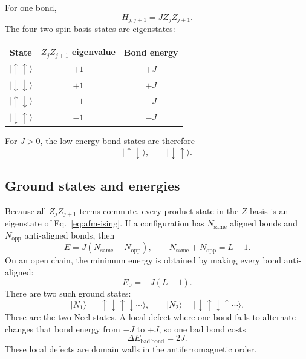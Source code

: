 \documentclass[11pt]{article}
\newcommand{\ket}[1]{|#1\rangle}
\newcommand{\up}{\uparrow}
\newcommand{\down}{\downarrow}
\begin{document}
For one bond,
\begin{equation}
  H_{j,j+1}=JZ_jZ_{j+1}.
\end{equation}
The four two-spin basis states are eigenstates:
\begin{center}
\begin{tabular}{ccc}
\toprule
State & $Z_jZ_{j+1}$ eigenvalue & Bond energy \\
\midrule
$\ket{\up\up}$ & $+1$ & $+J$ \\
$\ket{\down\down}$ & $+1$ & $+J$ \\
$\ket{\up\down}$ & $-1$ & $-J$ \\
$\ket{\down\up}$ & $-1$ & $-J$ \\
\bottomrule
\end{tabular}
\end{center}
For $J>0$, the low-energy bond states are therefore
\begin{equation}
  \ket{\up\down},
  \qquad
  \ket{\down\up}.
\end{equation}

\subsection{Ground states and energies}

Because all $Z_jZ_{j+1}$ terms commute, every product state in the $Z$ basis is
an eigenstate of Eq.~\eqref{eq:afm-ising}. If a configuration has
$N_{\mathrm{same}}$ aligned bonds and $N_{\mathrm{opp}}$ anti-aligned bonds,
then
\begin{equation}
  E=J(N_{\mathrm{same}}-N_{\mathrm{opp}}),
  \qquad
  N_{\mathrm{same}}+N_{\mathrm{opp}}=L-1.
\end{equation}
On an open chain, the minimum energy is obtained by making every bond
anti-aligned:
\begin{equation}
  E_0=-J(L-1).
\end{equation}
There are two such ground states:
\begin{equation}
  \ket{N_1}=\ket{\up\down\up\down\cdots},
  \qquad
  \ket{N_2}=\ket{\down\up\down\up\cdots}.
  \label{eq:neel-states}
\end{equation}
These are the two Neel states. A local defect where one bond fails to alternate
changes that bond energy from $-J$ to $+J$, so one bad bond costs
\begin{equation}
  \Delta E_{\mathrm{bad\ bond}}=2J.
\end{equation}
These local defects are domain walls in the antiferromagnetic order.
\end{document}
